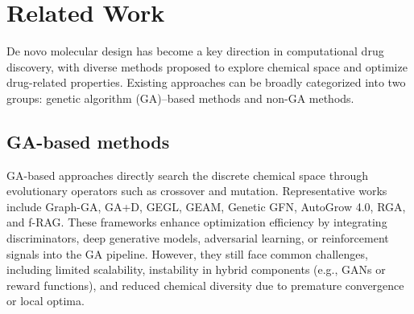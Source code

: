 \documentclass[lettersize,journal]{IEEEtran}
\begin{document}
\section{Related Work}
De novo molecular design has become a key direction in computational drug discovery, with diverse methods proposed to explore chemical space and optimize drug-related properties. Existing approaches can be broadly categorized into two groups: genetic algorithm (GA)–based methods and non-GA methods.

\subsection{GA-based methods}
GA-based approaches directly search the discrete chemical space through evolutionary operators such as crossover and mutation. Representative works include Graph-GA\cite{jensenGraphBasedGeneticAlgorithm2019}, GA+D\cite{nigamAugmentingGeneticAlgorithms2020}, GEGL\cite{ahnGuidingDeepMolecular2020}, GEAM\cite{lee2023drug}, Genetic GFN\cite{kim2024genetic}, AutoGrow 4.0\cite{spiegelAutoGrow4OpensourceGenetic2020}, RGA\cite{fuReinforcedGeneticAlgorithm}, and f-RAG\cite{lee2024molecule}. These frameworks enhance optimization efficiency by integrating discriminators, deep generative models, adversarial learning, or reinforcement signals into the GA pipeline. However, they still face common challenges, including limited scalability, instability in hybrid components (e.g., GANs or reward functions), and reduced chemical diversity due to premature convergence or local optima.
\end{document}

